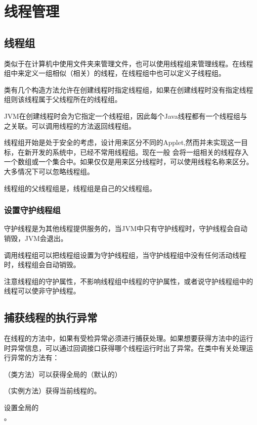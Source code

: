 \documentclass[a4paper]{report}
\begin{document}
\chapter{线程管理}
\section{线程组}
类似于在计算机中使用文件夹来管理文件，也可以使用线程组来管理线程。在线程组中来定义一组相似（相关）的线程，在线程组中也可以定义子线程组。

类有几个构造方法允许在创建线程时指定线程组，如果在创建线程时没有指定线程组则该线程属于父线程所在的线程组。

JVM在创建线程时会为它指定一个线程组，因此每个Java线程都有一个线程组与之关联。可以调用线程的方法返回线程组。

线程组开始是处于安全的考虑，设计用来区分不同的Applet,然而并未实现这一目标，在新开发的系统中，已经不常用线程组。现在一般 会将一组相关的线程存入一个数组或一个集合中。如果仅仅是用来区分线程时，可以使用线程名称来区分。大多情况下可以忽略线程组。

线程组的父线程组是，线程组是自己的父线程组。

\subsection{设置守护线程组}
守护线程是为其他线程提供服务的，当JVM中只有守护线程时，守护线程会自动销毁，JVM会退出。

调用线程组可以把线程组设置为守护线程组，当守护线程组中没有任何活动线程时，线程组会自动销毁。

注意线程组的守护属性，不影响线程组中线程的守护属性，或者说守护线程组中的线程可以使非守护线程。
\section{捕获线程的执行异常}
在线程的方法中，如果有受检异常必须进行捕获处理。如果想要获得方法中的运行时异常信息，可以通过回调接口获得哪个线程运行时出了异常。在类中有关处理运行异常的方法有：

（类方法）可以获得全局的（默认的）

（实例方法）获得当前线程的。

设置全局的\\
。
\end{document}
